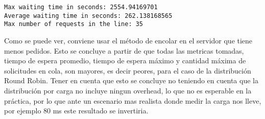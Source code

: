 \documentclass[11pt]{article}
\begin{document}
    \begin{Verbatim}[commandchars=\\\{\}]
Max waiting time in seconds: 2554.94169701
Average waiting time in seconds: 262.138168565
Max number of requests in the line: 35

    \end{Verbatim}

    Como se puede ver, conviene usar el método de encolar en el servidor que
tiene menos pedidos. Esto se concluye a partir de que todas las metricas
tomadas, tiempo de espera promedio, tiempo de espera máximo y cantidad
máxima de solicitudes en cola, son mayores, es decir peores, para el
caso de la distribución Round Robin. Tener en cuenta que esto se
concluye no teniendo en cuenta que la distribución por carga no incluye
ningun overhead, lo que no es esperable en la práctica, por lo que ante
un escenario mas realista donde medir la carga nos lleve, por ejemplo 80
ms este resultado se invertiria.


    
    
    
    
\end{document}

